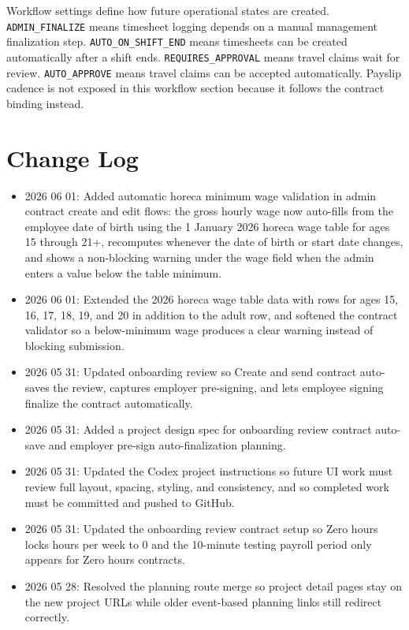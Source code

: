 \documentclass[11pt]{article}
\newcommand{\code}[1]{\nolinkurl{#1}}
\begin{document}
Workflow settings define how future operational states are created. \code{ADMIN_FINALIZE} means timesheet logging depends on a manual management finalization step. \code{AUTO_ON_SHIFT_END} means timesheets can be created automatically after a shift ends. \code{REQUIRES_APPROVAL} means travel claims wait for review. \code{AUTO_APPROVE} means travel claims can be accepted automatically. Payslip cadence is not exposed in this workflow section because it follows the contract binding instead.

\section*{Change Log}

\begin{itemize}
    \item 2026 06 01: Added automatic horeca minimum wage validation in admin contract create and edit flows: the gross hourly wage now auto-fills from the employee date of birth using the 1 January 2026 horeca wage table for ages 15 through 21+, recomputes whenever the date of birth or start date changes, and shows a non-blocking warning under the wage field when the admin enters a value below the table minimum.
    \item 2026 06 01: Extended the 2026 horeca wage table data with rows for ages 15, 16, 17, 18, 19, and 20 in addition to the adult row, and softened the contract validator so a below-minimum wage produces a clear warning instead of blocking submission.
    \item 2026 05 31: Updated onboarding review so Create and send contract auto-saves the review, captures employer pre-signing, and lets employee signing finalize the contract automatically.
    \item 2026 05 31: Added a project design spec for onboarding review contract auto-save and employer pre-sign auto-finalization planning.
    \item 2026 05 31: Updated the Codex project instructions so future UI work must review full layout, spacing, styling, and consistency, and so completed work must be committed and pushed to GitHub.
    \item 2026 05 31: Updated the onboarding review contract setup so Zero hours locks hours per week to 0 and the 10-minute testing payroll period only appears for Zero hours contracts.
    \item 2026 05 28: Resolved the planning route merge so project detail pages stay on the new project URLs while older event-based planning links still redirect correctly.

\end{itemize}
\end{document}
